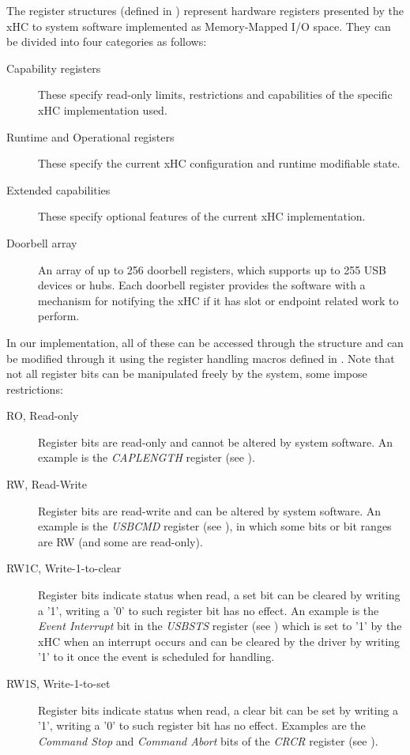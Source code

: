 The register structures (defined in )
represent hardware registers presented by the xHC to system software
implemented as Memory-Mapped I/O space. They can be divided into four categories as follows:
~
\begin{description}
	\item[Capability registers]
		These specify read-only limits, restrictions and capabilities of the specific
		xHC implementation used.
	\item[Runtime and Operational registers]
		These specify the current xHC configuration and runtime modifiable state.
	\item[Extended capabilities]
		These specify optional features of the current xHC implementation.
	\item[Doorbell array]
		An array of up to 256 doorbell registers, which supports up to 255 USB devices
		or hubs. Each doorbell register provides the software with a mechanism for
		notifying the xHC if it has slot or endpoint related work to perform.
\end{description}

In our implementation, all of these can be accessed through the  structure and
can be modified through it using the register handling macros defined in
. Note that not all register bits can be
manipulated freely by the system, some impose restrictions:
~
\begin{description}
	\item[RO, Read-only]
		Register bits are read-only and cannot be altered by system software. An example
		is the \textit{CAPLENGTH} register (see ).
	\item[RW, Read-Write]
		Register bits are read-write and can be altered by system software. An example
		is the \textit{USBCMD} register (see ), in which some bits or bit ranges
		are RW (and some are read-only).
	\item[RW1C, Write-1-to-clear]
		Register bits indicate status when read, a set bit can be cleared by writing
		a '1', writing a '0' to such register bit has no effect. An example is
		the \textit{Event Interrupt} bit in the \textit{USBSTS} register (see ) which is set
		to '1' by the xHC when an interrupt occurs and can be cleared by the driver
		by writing '1' to it once the event is scheduled for handling.
	\item[RW1S, Write-1-to-set]
		Register bits indicate status when read, a clear bit can be set by writing
		a '1', writing a '0' to such register bit has no effect. Examples are the
		\textit{Command Stop} and \textit{Command Abort} bits of the \textit{CRCR} register
		(see ).
\end{description}

